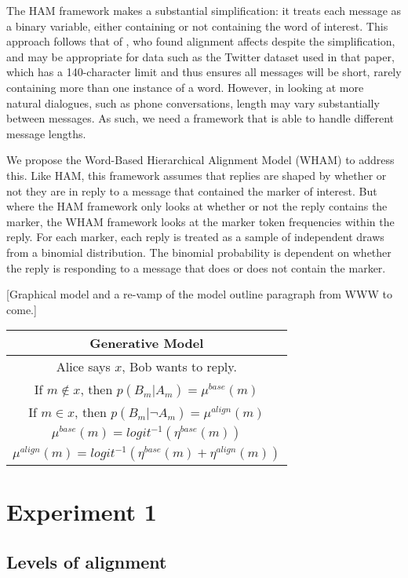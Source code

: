 \documentclass[11pt]{article}
\begin{document}
The HAM framework makes a substantial simplification: it treats each message as a binary variable, either containing or not containing the word of interest. This approach follows that of \cite{DNMGamonDumais2011}, who found alignment affects despite the simplification, and may be appropriate for data such as the Twitter dataset used in that paper, which has a 140-character limit and thus ensures all messages will be short, rarely containing more than one instance of a word. However, in looking at more natural dialogues, such as phone conversations, length may vary substantially between messages.  As such, we need a framework that is able to handle different message lengths.

We propose the Word-Based Hierarchical Alignment Model (WHAM) to address this. Like HAM, this framework assumes that replies are shaped by whether or not they are in reply to a message that contained the marker of interest. But where the HAM framework only looks at whether or not the reply contains the marker, the WHAM framework looks at the marker token frequencies within the reply.  For each marker, each reply is treated as a sample of independent draws from a binomial distribution. The binomial probability is dependent on whether the reply is responding to a message that does or does not contain the marker.

[Graphical model and a re-vamp of the model outline paragraph from WWW  to come.]

\begin{center}
\begin{tabular}{|c|}
\hline 
Generative Model \\
\hline
Alice says $x$, Bob wants to reply. \\
If $m \not\in x$, then $p(B_m|A_m) = \mu^{base}(m)$ \\
If $m \in x$, then $p(B_m|\neg A_m) = \mu^{align}(m)$ \\
\hline
$\mu^{base}(m) = logit^{-1}(\eta^{base}(m))$ \\
$\mu^{align}(m) = logit^{-1}(\eta^{base}(m)+\eta^{align}(m))$ \\
\hline
\end{tabular}
\end{center}

\section{Experiment 1}

\subsection{Levels of alignment}
\end{document}
